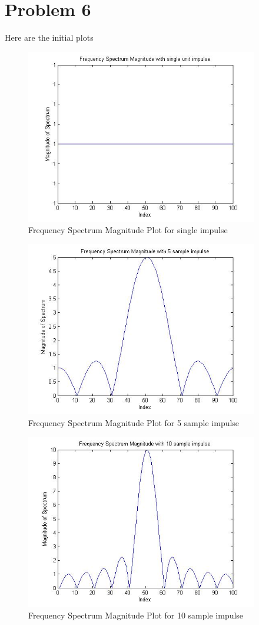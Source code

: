 \documentclass[11pt,psfig]{article}
\begin{document}
\newpage

\section*{Problem 6}

Here are the initial plots

\begin{figure}[H]
\centering
\includegraphics[height=3in]{prob6plot_freq1.jpg}
\caption{Frequency Spectrum Magnitude Plot for single impulse}
\end{figure}

\begin{figure}[H]
\centering
\includegraphics[height=3in]{prob6plot_freq5.jpg}
\caption{Frequency Spectrum Magnitude Plot for 5 sample impulse}
\end{figure}

\begin{figure}[H]
\centering
\includegraphics[height=3in]{prob6plot_freq10.jpg}
\caption{Frequency Spectrum Magnitude Plot for 10 sample impulse}
\end{figure}
\end{document}
